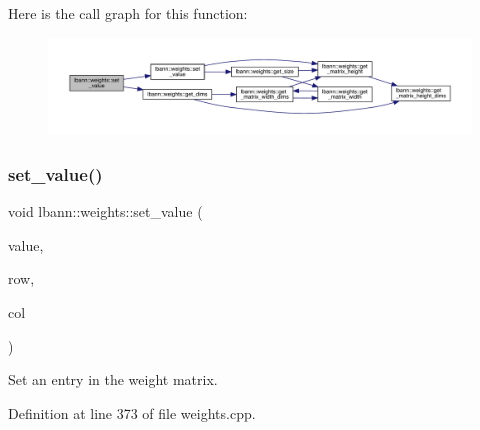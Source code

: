 Here is the call graph for this function\+:\nopagebreak
\begin{figure}[H]
\begin{center}
\leavevmode
\includegraphics[width=350pt]{classlbann_1_1weights_aca05fb7e298c8f9f1f30fa1a8eac9fbf_cgraph}
\end{center}
\end{figure}
\mbox{\label{classlbann_1_1weights_a7ac0a9e53b249f16d5e2978e47bd6b7f}} 
\subsubsection{\texorpdfstring{set\+\_\+value()}{set\_value()}\hspace{0.1cm}{\footnotesize\ttfamily [3/3]}}
{\footnotesize\ttfamily void lbann\+::weights\+::set\+\_\+value (\begin{DoxyParamCaption}\item[{Data\+Type}]{value,  }\item[{int}]{row,  }\item[{int}]{col }\end{DoxyParamCaption})}

Set an entry in the weight matrix. 

Definition at line 373 of file weights.\+cpp.


